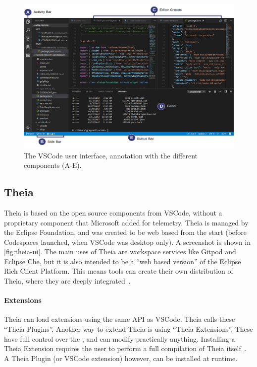 \begin{figure}[htbp]  %
  \centering
  \includegraphics[width=\textwidth]{figures/pre-project/vscode-ui.png}
  \caption[VSCode User Interface]{The \gls{VSCode} user interface, annotation with the different components (A-E).}\label{fig:vscode-ui}
\end{figure}

\subsection{Theia}

Theia is based on the \gls{open source} components from \gls{VSCode}, without a proprietary component that Microsoft added for telemetry.
Theia is managed by the Eclipse Foundation, and was created to be web based from the start (before Codespaces launched, when \gls{VSCode} was desktop only).
A screenshot is shown in \cref{fig:theia-ui}.
The main uses of Theia are workspace services like \gls{Gitpod} and Eclipse Che, but it is also intended to be a ``web based version'' of the Eclipse Rich Client Platform.
This means tools can create their own distribution of Theia, where they are deeply integrated~\cite{helmingEclipseTheiaIDE2019a}.

\paragraph{Extensions}
Theia can load extensions using the same \acrfull{API} as \gls{VSCode}.
Theia calls these ``Theia Plugins''.
Another way to extend Theia is using ``Theia Extensions''.
These have full control over the , and can modify practically anything.
Installing a Theia Extension requires the user to perform a full compilation of \gls{Theia} itself~\cite{helmingHowAddExtensions2019}.
A Theia Plugin (or \gls{VSCode} extension) however, can be installed at runtime.


